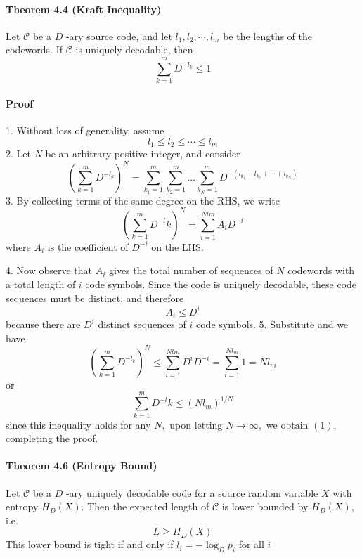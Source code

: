\documentclass[8pt]{article}
\begin{document}
\begin{tcolorbox}
\paragraph{Theorem 4.4 (Kraft Inequality)} Let $\mathcal{C}$ be a $D$ -ary source code, and let $l_{1}, l_{2}, \cdots, l_{m}$ be the lengths of the codewords. If $\mathcal{C}$ is uniquely decodable, then
$$
\sum_{k=1}^{m} D^{-l_{k}} \leq 1
$$
\end{tcolorbox}
\paragraph{Proof}
1. Without loss of generality, assume
$$
l_{1} \leq l_{2} \leq \cdots \leq l_{m}
$$
2. Let $N$ be an arbitrary positive integer, and consider
$$
\left(\sum_{k=1}^{m} D^{-l_{k}}\right)^{N}
= \sum_{k_{1}=1}^{m} \sum_{k_{2}=1}^{m} \ldots \sum_{k_{N}=1}^{m} D^{-\left(l_{k_{1}}+l_{k_{2}}+\cdots+l_{k_{N}}\right)}
$$
3. By collecting terms of the same degree on the $\mathrm{RHS}$, we write
$$
\left(\sum_{k=1}^{m} D^{-l} k\right)^{N}=\sum_{i=1}^{N l m} A_{i} D^{-i}
$$
where $A_{i}$ is the coefficient of $D^{-i}$ on the LHS.

4. Now observe that $A_{i}$ gives the total number of sequences of $N$ codewords with a total length of $i$ code symbols. Since the code is uniquely decodable, these code sequences must be distinct, and therefore
$$
A_{i} \leq D^{i}
$$
because there are $D^{i}$ distinct sequences of $i$ code symbols.
5. Substitute and we have
$$
\left(\sum_{k=1}^{m} D^{-l_{k}}\right)^{N} \leq \sum_{i=1}^{N l m} D^{i} D^{-i}=\sum_{i=1}^{N l_{m}} 1=N l_{m}
$$
or
$$
\sum_{k=1}^{m} D^{-l} k \leq\left(N l_{m}\right)^{1 / N}
$$
since this inequality holds for any $N,$ upon letting $N \rightarrow \infty,$ we obtain $(1),$ completing the proof.


\begin{tcolorbox}
\paragraph{Theorem 4.6 (Entropy Bound)} Let $\mathcal{C}$ be a $D$ -ary uniquely decodable code for a source random variable $X$ with entropy $H_{D}(X) .$ Then the expected length of $\mathcal{C}$ is lower bounded by $H_{D}(X),$ i.e.
$$
L \geq H_{D}(X)
$$
This lower bound is tight if and only if $l_{i}=-\log _{D} p_{i}$ for all $i$
\end{tcolorbox}
\end{document}
